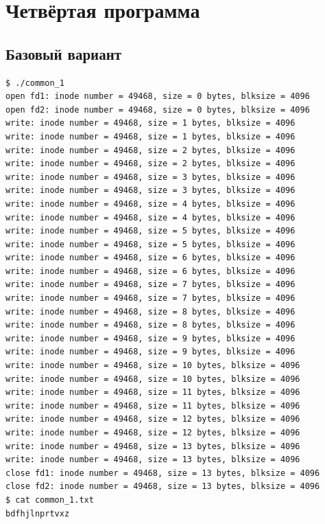 \documentclass[a4paper,14pt]{extarticle}
\begin{document}
\section{Четвёртая программа}

\subsection{Базовый вариант}



\begin{lstlisting}[caption={\text{Вывод программы}}]
$ ./common_1
open fd1: inode number = 49468, size = 0 bytes, blksize = 4096
open fd2: inode number = 49468, size = 0 bytes, blksize = 4096
write: inode number = 49468, size = 1 bytes, blksize = 4096
write: inode number = 49468, size = 1 bytes, blksize = 4096
write: inode number = 49468, size = 2 bytes, blksize = 4096
write: inode number = 49468, size = 2 bytes, blksize = 4096
write: inode number = 49468, size = 3 bytes, blksize = 4096
write: inode number = 49468, size = 3 bytes, blksize = 4096
write: inode number = 49468, size = 4 bytes, blksize = 4096
write: inode number = 49468, size = 4 bytes, blksize = 4096
write: inode number = 49468, size = 5 bytes, blksize = 4096
write: inode number = 49468, size = 5 bytes, blksize = 4096
write: inode number = 49468, size = 6 bytes, blksize = 4096
write: inode number = 49468, size = 6 bytes, blksize = 4096
write: inode number = 49468, size = 7 bytes, blksize = 4096
write: inode number = 49468, size = 7 bytes, blksize = 4096
write: inode number = 49468, size = 8 bytes, blksize = 4096
write: inode number = 49468, size = 8 bytes, blksize = 4096
write: inode number = 49468, size = 9 bytes, blksize = 4096
write: inode number = 49468, size = 9 bytes, blksize = 4096
write: inode number = 49468, size = 10 bytes, blksize = 4096
write: inode number = 49468, size = 10 bytes, blksize = 4096
write: inode number = 49468, size = 11 bytes, blksize = 4096
write: inode number = 49468, size = 11 bytes, blksize = 4096
write: inode number = 49468, size = 12 bytes, blksize = 4096
write: inode number = 49468, size = 12 bytes, blksize = 4096
write: inode number = 49468, size = 13 bytes, blksize = 4096
write: inode number = 49468, size = 13 bytes, blksize = 4096
close fd1: inode number = 49468, size = 13 bytes, blksize = 4096
close fd2: inode number = 49468, size = 13 bytes, blksize = 4096
$ cat common_1.txt
bdfhjlnprtvxz 
\end{lstlisting}
\end{document}

